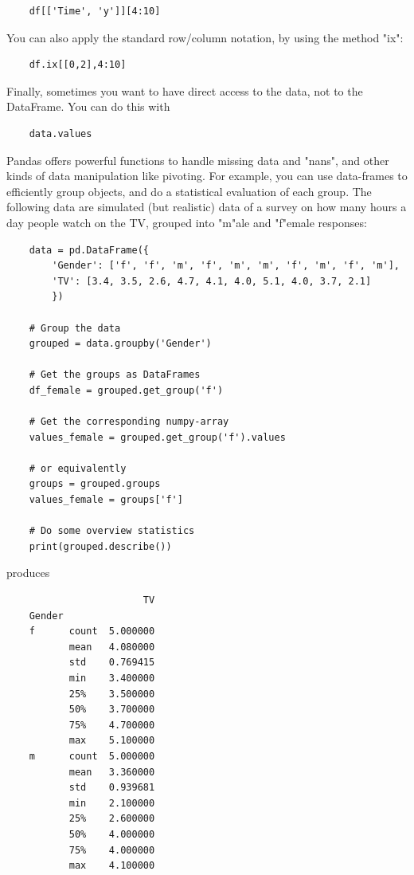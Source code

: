 \begin{lstlisting}
    df[['Time', 'y']][4:10]
\end{lstlisting}

You can also apply the standard row/column notation, by using the method "ix":

\begin{lstlisting}
    df.ix[[0,2],4:10]
\end{lstlisting}

Finally, sometimes you want to have direct access to the data, not to the DataFrame. You can do this with

\begin{lstlisting}
    data.values
\end{lstlisting}

Pandas offers powerful functions to handle missing data and "nans", and other kinds of data manipulation like pivoting.
For example, you can use data-frames to efficiently group objects, and do a statistical evaluation of each group. The following data are simulated (but realistic) data of a survey on how many hours a day people watch on the TV, grouped into "m"ale and "f"emale responses:

\begin{lstlisting}
    data = pd.DataFrame({
        'Gender': ['f', 'f', 'm', 'f', 'm', 'm', 'f', 'm', 'f', 'm'],
        'TV': [3.4, 3.5, 2.6, 4.7, 4.1, 4.0, 5.1, 4.0, 3.7, 2.1]
        })

    # Group the data
    grouped = data.groupby('Gender')

    # Get the groups as DataFrames
    df_female = grouped.get_group('f')

    # Get the corresponding numpy-array
    values_female = grouped.get_group('f').values

    # or equivalently
    groups = grouped.groups
    values_female = groups['f']

    # Do some overview statistics
    print(grouped.describe())
\end{lstlisting}

produces

\begin{lstlisting}
                        TV
    Gender
    f      count  5.000000
           mean   4.080000
           std    0.769415
           min    3.400000
           25%    3.500000
           50%    3.700000
           75%    4.700000
           max    5.100000
    m      count  5.000000
           mean   3.360000
           std    0.939681
           min    2.100000
           25%    2.600000
           50%    4.000000
           75%    4.000000
           max    4.100000
\end{lstlisting}

